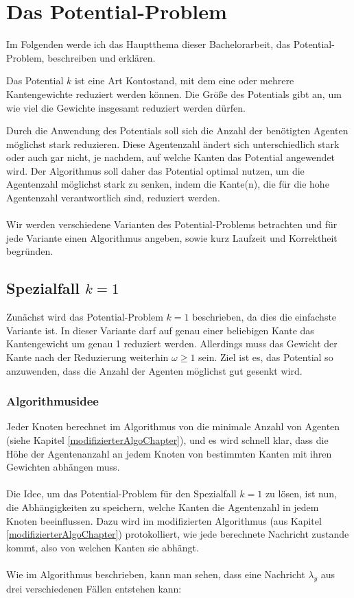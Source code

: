 \section{Das Potential-Problem}\label{kap_pot}

Im Folgenden werde ich das Hauptthema dieser Bachelorarbeit, das Potential-Problem, beschreiben und erklären.

\begin{mydef}\label{def_potential}
	Das Potential $k$ ist eine Art Kontostand, mit dem eine oder mehrere Kantengewichte reduziert werden können. Die Größe des Potentials gibt an, um wie viel die Gewichte insgesamt reduziert werden dürfen. 
\end{mydef}
Durch die Anwendung des Potentials soll sich die Anzahl der benötigten Agenten möglichst stark reduzieren. Diese Agentenzahl ändert sich unterschiedlich stark oder auch gar nicht, je nachdem, auf welche Kanten das Potential angewendet wird. Der Algorithmus soll daher das Potential optimal nutzen, um die Agentenzahl möglichst stark zu senken, indem die Kante(n), die für die hohe Agentenzahl verantwortlich sind, reduziert werden.
\\
\\
Wir werden verschiedene Varianten des Potential-Problems betrachten und für jede Variante einen Algorithmus angeben, sowie kurz Laufzeit und Korrektheit begründen.

\subsection{Spezialfall $k = 1$}\label{kap_pot=1}

Zunächst wird das Potential-Problem $k = 1$ beschrieben, da dies die einfachste Variante ist. In dieser Variante darf auf genau einer beliebigen Kante das Kantengewicht um genau 1 reduziert werden. Allerdings muss das Gewicht der Kante nach der Reduzierung weiterhin $\omega \geq 1$ sein. Ziel ist es, das Potential so anzuwenden, dass die Anzahl der Agenten möglichst gut gesenkt wird.


\subsubsection{Algorithmusidee}

Jeder Knoten berechnet im Algorithmus von \cite{cima_paper} die minimale Anzahl von Agenten (siehe Kapitel \ref{modifizierterAlgoChapter}), und es wird schnell klar, dass die Höhe der Agentenanzahl an jedem Knoten von bestimmten Kanten mit ihren Gewichten abhängen muss.
\\
\\
Die Idee, um das Potential-Problem für den Spezialfall $k = 1$ zu lösen, ist nun, die Abhängigkeiten zu speichern, welche Kanten die Agentenzahl in jedem Knoten beeinflussen. Dazu wird im modifizierten Algorithmus (aus Kapitel \ref{modifizierterAlgoChapter}) protokolliert, wie jede berechnete Nachricht zustande kommt, also von welchen Kanten sie abhängt.
\\
\\ 
Wie im Algorithmus beschrieben, kann man sehen, dass eine Nachricht $\lambda_{y}$ aus drei verschiedenen Fällen entstehen kann:

